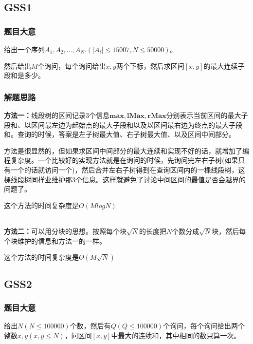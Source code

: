 	\subsection{GSS1}
	\subsubsection{题目大意} \par
	给出一个序列$A_1,A_2,\ldots,A_N.(|A_i|\leq 15007,N\leq 50000)$。\par
	然后给出$M$个询问，每个询问给出$x,y$两个下标，然后求区间$[x,y]$的最大连续子段和是多少。\par
	\subsubsection{解题思路} \par
	\textbf{方法一：}线段树的区间记录$3$个信息$\mathbf{max,lMax,rMax}$分别表示当前区间的最大子段和、以区间最左边为起始点的最大子段和以及以区间最右边为终点的最大子段和。查询的时候，答案是左子树最大值、右子树最大值、以及区间中间部分。\par
	方法是很显然的，但如果求区间中间部分的最大连续和实现不好的话，就增加了编程复杂度。一个比较好的实现方法就是在询问的时候，先询问完左右子树(如果只有一个的话就访问一个)，然后合并左右子树得到在查询区间内的一棵线段树，这棵线段树同样业维护那$3$个信息。这样就避免了讨论中间区间的最值是否会越界的问题了。\par
	这个方法的时间复杂度是$O(MlogN)$
	~\\
	~\par
	\textbf{方法二：}可以用分块的思想。按照每个块$\sqrt N$的长度把$N$个数分成$\sqrt N$块，然后每个块维护的信息和方法一的一样。\par
	这个方法的时间复杂度是$O(M\sqrt N)$

	\subsection{GSS2}
	\subsubsection{题目大意} \par
	给出$N(N\leq 100000)$个数，然后有$Q(Q\leq 100000)$个询问，每个询问给出两个整数$x,y(x,y\leq N)$，问区间$[x,y]$中最大的连续和，其中相同的数只算一次。
